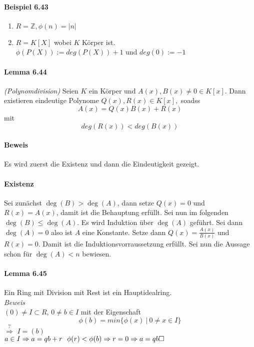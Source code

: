 \documentclass{scrartcl}
\begin{document}
\paragraph{Beispiel 6.43}
\begin{enumerate}
\item $R = \mathbb{Z}, \phi(n) = |n|$
\item $R = K[X]$ wobei $K$ Körper ist. \\
  $\phi(P(X)) := deg(P(X)) + 1$ und $deg(0) := -1$
\end{enumerate}

\paragraph{Lemma 6.44} \textit{(Polynomdivision)}
Seien $K$ ein Körper und $A(x),B(x) \neq 0 \in K[x]$. Dann existieren eindeutige
Polynome $Q(x), R(x) \in K[x],$ soadss
\[
  A(x) = Q(x)B(x) + R(x)
\]
mit
\[
  deg(R(x)) < deg(B(x))
\]
\paragraph{Beweis}
Es wird zuerst die Existenz und dann die Eindeutigkeit gezeigt.
\paragraph{Existenz}
Sei zunächst $\deg(B) > \deg(A)$, dann setze $Q(x)=0$ und $R(x)=A(x)$, damit ist
die Behauptung erfüllt. Sei nun im folgenden $\deg(B) \leq \deg(A)$.
Es wird Induktion über $\deg(A)$ geführt. Sei dann $\deg(A)=0$ also ist $A$ eine
Konstante. Setze dann $Q(x)=\frac{A(x)}{B(x)}$ und $R(x)=0$. Damit ist die
Induktionsvorraussetzung erfüllt. Sei nun die Aussage schon für $\deg(A) < n$ bewiesen.

\paragraph{Lemma 6.45}
Ein Ring mit Division mit Rest ist ein Hauptidealring. \\
\textit{Beweis} \\
$(0) \neq I \subset R$, $0 \neq b \in I$ mit der Eigenschaft
\[
  \phi(b) = min\{\phi(x) ~|~ 0 \neq x \in I\}
\]
$\overset{?}{\Rightarrow}$ $I = (b)$ \\
$a \in I \Rightarrow a = qb + r ~~ \phi(r) < \phi(b) \Rightarrow r = 0
\Rightarrow a = qb \hfill \square$
\end{document}
